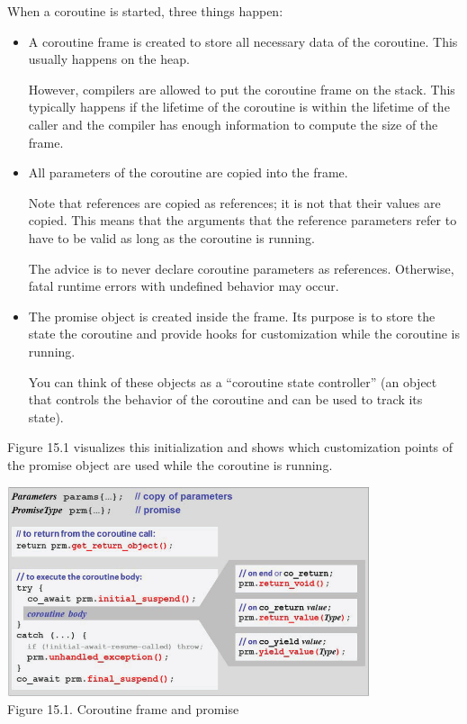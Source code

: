
When a coroutine is started, three things happen:

\begin{itemize}
\item 
A coroutine frame is created to store all necessary data of the coroutine. This usually happens on the heap.

However, compilers are allowed to put the coroutine frame on the stack. This typically happens if the lifetime of the coroutine is within the lifetime of the caller and the compiler has enough information to compute the size of the frame.

\item 
All parameters of the coroutine are copied into the frame.

Note that references are copied as references; it is not that their values are copied. This means that the arguments that the reference parameters refer to have to be valid as long as the coroutine is running.

The advice is to never declare coroutine parameters as references. Otherwise, fatal runtime errors with undefined behavior may occur.

\item 
The promise object is created inside the frame. Its purpose is to store the state the coroutine and provide hooks for customization while the coroutine is running.

You can think of these objects as a “coroutine state controller” (an object that controls the behavior of the coroutine and can be used to track its state).
\end{itemize}

Figure 15.1 visualizes this initialization and shows which customization points of the promise object are used while the coroutine is running.

\begin{center}
\includegraphics[width=0.8\textwidth]{content/chapter15/images/1.png}\\
Figure 15.1. Coroutine frame and promise
\end{center}

